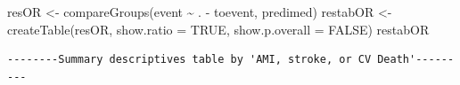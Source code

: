 \documentclass[
]{book}
\newenvironment{Shaded}{\begin{snugshade}}{\end{snugshade}}
\newcommand{\AttributeTok}[1]{\textcolor[rgb]{0.77,0.63,0.00}{#1}}
\newcommand{\ConstantTok}[1]{\textcolor[rgb]{0.00,0.00,0.00}{#1}}
\newcommand{\FunctionTok}[1]{\textcolor[rgb]{0.00,0.00,0.00}{#1}}
\newcommand{\NormalTok}[1]{#1}
\newcommand{\OtherTok}[1]{\textcolor[rgb]{0.56,0.35,0.01}{#1}}
\newcommand{\SpecialCharTok}[1]{\textcolor[rgb]{0.00,0.00,0.00}{#1}}
\begin{document}
\begin{Shaded}
\begin{Highlighting}[]
\NormalTok{resOR }\OtherTok{\textless{}{-}} \FunctionTok{compareGroups}\NormalTok{(event }\SpecialCharTok{\textasciitilde{}}\NormalTok{ . }\SpecialCharTok{{-}}\NormalTok{ toevent, predimed)}
\NormalTok{restabOR }\OtherTok{\textless{}{-}} \FunctionTok{createTable}\NormalTok{(resOR, }\AttributeTok{show.ratio =} \ConstantTok{TRUE}\NormalTok{,}
                        \AttributeTok{show.p.overall =} \ConstantTok{FALSE}\NormalTok{)}
\NormalTok{restabOR}
\end{Highlighting}
\end{Shaded}

\begin{verbatim}
--------Summary descriptives table by 'AMI, stroke, or CV Death'---------


\end{verbatim}
\end{document}
